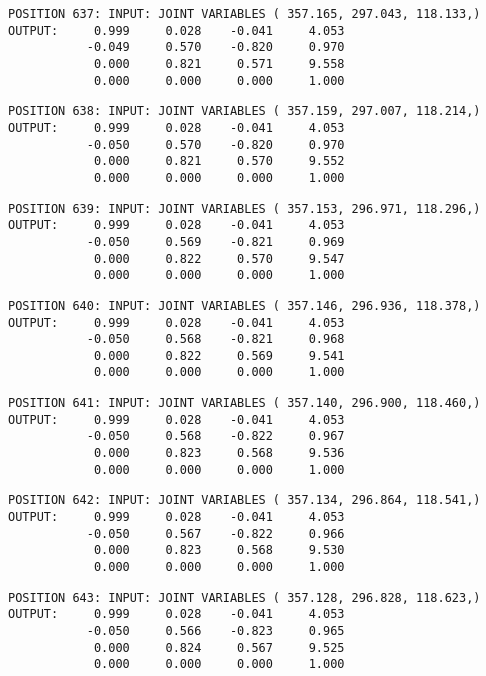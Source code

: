 \begin{verbatim}
POSITION 637: INPUT: JOINT VARIABLES ( 357.165, 297.043, 118.133,)
OUTPUT:     0.999     0.028    -0.041     4.053
           -0.049     0.570    -0.820     0.970
            0.000     0.821     0.571     9.558
            0.000     0.000     0.000     1.000
\end{verbatim} \pagebreak[1]\begin{verbatim}
POSITION 638: INPUT: JOINT VARIABLES ( 357.159, 297.007, 118.214,)
OUTPUT:     0.999     0.028    -0.041     4.053
           -0.050     0.570    -0.820     0.970
            0.000     0.821     0.570     9.552
            0.000     0.000     0.000     1.000
\end{verbatim} \pagebreak[1]\begin{verbatim}
POSITION 639: INPUT: JOINT VARIABLES ( 357.153, 296.971, 118.296,)
OUTPUT:     0.999     0.028    -0.041     4.053
           -0.050     0.569    -0.821     0.969
            0.000     0.822     0.570     9.547
            0.000     0.000     0.000     1.000
\end{verbatim} \pagebreak[1]\begin{verbatim}
POSITION 640: INPUT: JOINT VARIABLES ( 357.146, 296.936, 118.378,)
OUTPUT:     0.999     0.028    -0.041     4.053
           -0.050     0.568    -0.821     0.968
            0.000     0.822     0.569     9.541
            0.000     0.000     0.000     1.000
\end{verbatim} \pagebreak[1]\begin{verbatim}
POSITION 641: INPUT: JOINT VARIABLES ( 357.140, 296.900, 118.460,)
OUTPUT:     0.999     0.028    -0.041     4.053
           -0.050     0.568    -0.822     0.967
            0.000     0.823     0.568     9.536
            0.000     0.000     0.000     1.000
\end{verbatim} \pagebreak[1]\begin{verbatim}
POSITION 642: INPUT: JOINT VARIABLES ( 357.134, 296.864, 118.541,)
OUTPUT:     0.999     0.028    -0.041     4.053
           -0.050     0.567    -0.822     0.966
            0.000     0.823     0.568     9.530
            0.000     0.000     0.000     1.000
\end{verbatim} \pagebreak[1]\begin{verbatim}
POSITION 643: INPUT: JOINT VARIABLES ( 357.128, 296.828, 118.623,)
OUTPUT:     0.999     0.028    -0.041     4.053
           -0.050     0.566    -0.823     0.965
            0.000     0.824     0.567     9.525
            0.000     0.000     0.000     1.000
\end{verbatim} \pagebreak[1]\begin{verbatim}

\end{verbatim}
